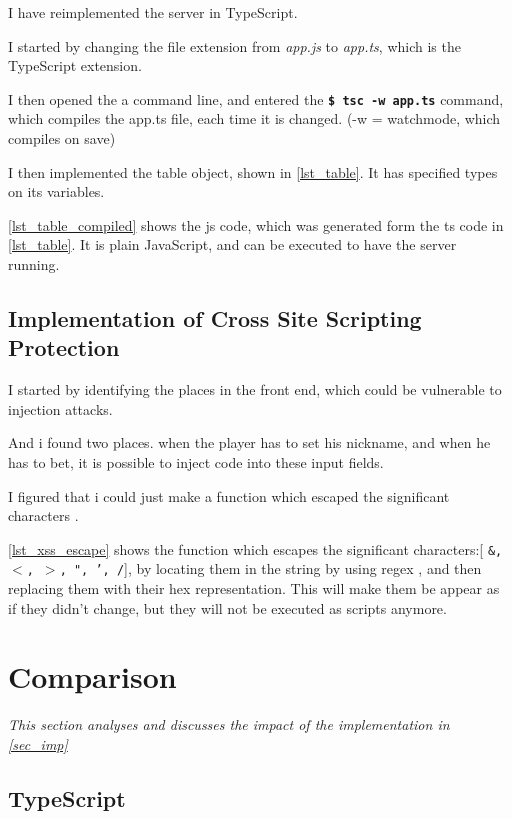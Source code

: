 \documentclass[a4paper]{article}
\begin{document}
I have reimplemented the server in TypeScript.

I started by changing the file extension from \textit{app.js} to \textit{app.ts}, which is the TypeScript extension.

I then opened the a command line, and entered the \textbf{\texttt{\$ tsc -w app.ts}} command, which compiles the app.ts file, each time it is changed. (-w = watchmode, which compiles on save)

I then implemented the table object, shown in \autoref{lst_table}. It has specified types on its variables.


\autoref{lst_table_compiled} shows the js code, which was generated form the ts code in \autoref{lst_table}. It is plain JavaScript, and can be executed to have the server running.


\subsection{Implementation of Cross Site Scripting Protection}
I started by identifying the places in the front end, which could be vulnerable to injection attacks.

And i found two places. when the player has to set his nickname, and when he has to bet, it is possible to inject code into these input fields.

I figured that i could just make a function which escaped the significant characters \cite{xss-prep}.

\autoref{lst_xss_escape} shows the function which escapes the significant characters:[ \texttt{\&, $<$, $>$, ", ', /}], by locating them in the string by using regex \cite{regex}, and then replacing them with their hex representation. This will make them be appear as if they didn't change, but they will not be executed as scripts anymore.




\section{Comparison}
\textit{This section analyses and discusses the impact of the implementation in \autoref{sec_imp}}


\subsection{TypeScript}
\end{document}
